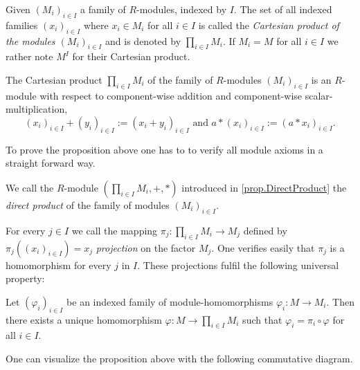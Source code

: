 Given $(M_i)_{i\in I}$ a family of $R$-modules, indexed by $I$. The set of all indexed families $(x_i)_{i\in I}$ where $x_i\in M_i$ for all $i\in I$ is called the \emph{Cartesian product of the modules $(M_i)_{i\in I}$} and is denoted by $\prod\limits_{i\in I} M_i$. If $M_i=M$ for all $i\in I$ we rather note $M^I$ for their Cartesian product.

\begin{pro}\label{prop.DirectProduct}
The Cartesian product $\prod_{i\in I} M_i$ of the family of $R$-modules $(M_i)_{i\in I}$ is an $R$-module with respect to component-wise addition and component-wise scalar-multiplication, \ie 
\[(x_i)_{i\in I}+(y_i)_{i\in I}:=(x_i+y_i)_{i\in I}\text{ and }a\ast(x_i)_{i\in I}:=(a\ast x_i)_{i\in I}.\]
\end{pro}

To prove the proposition above one has to to verify all module axioms in a straight forward way.

\begin{defin}\sloppypar
We call the $R$-module $\left(\prod_{i\in I} M_i,+,\ast\right)$ introduced in \cref{prop.DirectProduct} the \emph{direct product} of the family of modules $(M_i)_{i\in I}$.
\end{defin}

For every $j\in I$ we call the mapping $\pi_j\colon \prod_{i\in I} M_i\to M_j$ defined by $\pi_j((x_i)_{i\in I})=x_j$ \emph{projection} on the factor $M_j$. One verifies easily that $\pi_j$ is a homomorphism for every $j$ in $I$. These projections fulfil the following universal property:

\begin{pro}
Let $(\varphi_i)_{i\in I}$ be an indexed family of module-homomorphisms $\varphi_i\colon M\to M_i$. Then there exists a unique homomorphism $\varphi\colon M\to \prod_{i\in I} M_i$ such that $\varphi_i=\pi_i\circ\varphi$ for all $i\in I$.
\end{pro}

One can visualize the proposition above with the following commutative diagram.

\begin{center}
\end{center}


